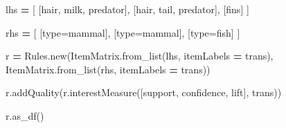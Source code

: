 \documentclass{article}
\newenvironment{Shaded}{\begin{snugshade}}{\end{snugshade}}
\newcommand{\NormalTok}[1]{#1}
\newcommand{\OperatorTok}[1]{\textcolor[rgb]{0.81,0.36,0.00}{\textbf{#1}}}
\newcommand{\StringTok}[1]{\textcolor[rgb]{0.31,0.60,0.02}{#1}}
\begin{document}
\begin{Shaded}
\begin{Highlighting}[]
\NormalTok{lhs }\OperatorTok{=}\NormalTok{ [}
\NormalTok{    [}\StringTok{\textquotesingle{}hair\textquotesingle{}}\NormalTok{, }\StringTok{\textquotesingle{}milk\textquotesingle{}}\NormalTok{, }\StringTok{\textquotesingle{}predator\textquotesingle{}}\NormalTok{],}
\NormalTok{    [}\StringTok{\textquotesingle{}hair\textquotesingle{}}\NormalTok{, }\StringTok{\textquotesingle{}tail\textquotesingle{}}\NormalTok{, }\StringTok{\textquotesingle{}predator\textquotesingle{}}\NormalTok{],}
\NormalTok{    [}\StringTok{\textquotesingle{}fins\textquotesingle{}}\NormalTok{]}
\NormalTok{]}

\NormalTok{rhs }\OperatorTok{=}\NormalTok{ [}
\NormalTok{    [}\StringTok{\textquotesingle{}type=mammal\textquotesingle{}}\NormalTok{],}
\NormalTok{    [}\StringTok{\textquotesingle{}type=mammal\textquotesingle{}}\NormalTok{],}
\NormalTok{    [}\StringTok{\textquotesingle{}type=fish\textquotesingle{}}\NormalTok{]}
\NormalTok{]}
                          
\NormalTok{r }\OperatorTok{=}\NormalTok{ Rules.new(ItemMatrix.from\_list(lhs, itemLabels }\OperatorTok{=}\NormalTok{ trans),}
\NormalTok{              ItemMatrix.from\_list(rhs, itemLabels }\OperatorTok{=}\NormalTok{ trans))}

\NormalTok{r.addQuality(r.interestMeasure([}\StringTok{\textquotesingle{}support\textquotesingle{}}\NormalTok{, }\StringTok{\textquotesingle{}confidence\textquotesingle{}}\NormalTok{, }\StringTok{\textquotesingle{}lift\textquotesingle{}}\NormalTok{], trans))}

\NormalTok{r.as\_df()}
\end{Highlighting}
\end{Shaded}
\end{document}
